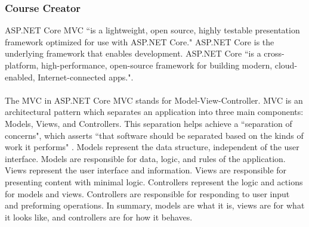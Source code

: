 \subsubsection{Course Creator}
ASP.NET Core MVC ``is a lightweight, open source, highly testable presentation framework optimized for use with ASP.NET Core." \cite{dotnetcoremvc} ASP.NET Core is the underlying framework that enables development. ASP.NET Core ``is a cross-platform, high-performance, open-source framework for building modern, cloud-enabled, Internet-connected apps."\cite{dotnetcore}.\\
\\
The MVC in ASP.NET Core MVC stands for Model-View-Controller. MVC is an architectural pattern which separates an application into three main components: Models, Views, and Controllers. This separation helps achieve a ``separation of concerns", which asserts ``that software should be separated based on the kinds of work it performs" \cite{separationOfConcerns}. Models represent the data structure, independent of the user interface. Models are responsible for data, logic, and rules of the application. Views represent the user interface and information. Views are responsible for presenting content with minimal logic. Controllers represent the logic and actions for models and views. Controllers are responsible for responding to user input and preforming operations. In summary, models are what it is, views are for what it looks like, and controllers are for how it behaves. \\
\\
